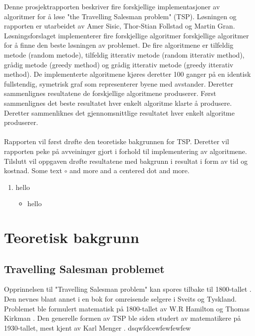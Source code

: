 \documentclass[12pt]{article}
\begin{document}
\indent
				Denne prosjektrapporten beskriver fire forskjellige implementasjoner av algoritmer for {\aa} l{\o}se "the Travelling Salesman problem" (TSP).
				L{\o}sningen og rapporten er utarbeidet av Amer Sisic, Thor-Stian Follstad og Martin Gran. L{\o}sningsforslaget implementerer fire forskjellige algoritmer
				forskjellige algoritmer for {\aa} finne den beste l{\o}sningen av problemet. De fire algoritmene er tilfeldig metode (random metode), tilfeldig itterativ metode (random itterativ method), gr{\aa}dig 
				metode (greedy method) og gr{\aa}dig itterativ metode (greedy itterativ method). De implementerte algoritmene kj{\o}res deretter 100 ganger p{\aa} en identisk
				fullstendig, symetrisk graf som representerer byene med avstander. Deretter sammenlignes resultatene de forskjellige algoritmene produserer. F{\o}rst sammenlignes
				det beste resultatet hver enkelt algoritme klarte {\aa} produsere. Deretter sammenliknes det gjennomsnittlige resultatet hver enkelt algoritme produserer. \\\\
				Rapporten vil f{\o}rst dr{\o}fte den teoretiske bakgrunnen for TSP. Deretter vil rapporten peke p{\aa} avveininger gjort i forhold til implementering av algoritmene.
				Tilslutt vil oppgaven dr{\o}fte resultatene med bakgrunn i resultat i form av tid og kostnad. \cite{a} 
				Some text \( \circ \) and more and a centered dot and more.
\begin{enumerate}
\item hello
\begin{itemize}
\item hello
\end{itemize}
\end{enumerate}
				


\section{Teoretisk bakgrunn}
\subsection{Travelling Salesman problemet}
				Opprinnelsen til "Travelling Salesman problem" kan spores tilbake til 1800-tallet \cite{b}. 
				Den nevnes blant annet i en bok for omreisende selgere i Sveits og Tyskland. Problemet ble formulert matematisk på 1800-tallet av W.R Hamilton og Thomas Kirkman \cite{c}. 
				Den generelle formen av TSP ble siden studert av matematikere på 1930-tallet, mest kjent av Karl Menger \cite{einstein}. dsqwfdcewfewfewfew \cite{a}

\newpage



\end{document}
